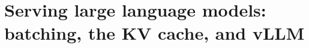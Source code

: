\chapter{Serving large language models: batching, the KV cache, and vLLM}
\label{ch:serving-large-language-models-batching}


